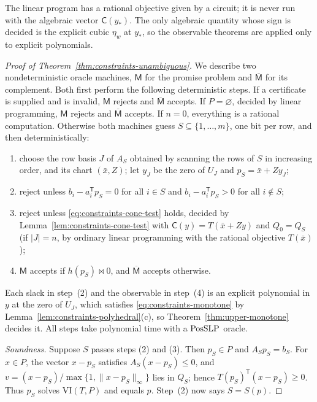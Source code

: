The linear program has a rational objective given by a circuit; it is never
run with the algebraic vector $\mathsf C(y_*)$. The only algebraic quantity
whose sign is decided is the explicit cubic $\eta_w$ at $y_*$, so the
observable theorems are applied only to explicit polynomials.

\begin{proof}[Proof of Theorem~\ref{thm:constraints-unambiguous}]
We describe two nondeterministic oracle machines, $\mathsf M$ for the
promise problem and $\overline{\mathsf M}$ for its complement. Both first
perform the following deterministic steps. If a certificate is supplied and is
invalid, $\mathsf M$ rejects and $\overline{\mathsf M}$ accepts. If
$P=\varnothing$, decided by linear programming, $\mathsf M$ rejects and
$\overline{\mathsf M}$ accepts. If $n=0$, everything is a rational
computation. Otherwise both machines guess $S\subseteq\{1,\ldots,m\}$, one bit
per row, and then deterministically:
\begin{enumerate}[label=(\arabic*)]
\item choose the row basis $J$ of $A_S$ obtained by scanning the rows of $S$
in increasing order, and its chart $(\bar x,Z)$; let $y_J$ be the zero of
$U_J$ and $p_S=\bar x+Zy_J$;
\item reject unless $b_i-a_i^{\mathsf T}p_S=0$ for all $i\in S$ and
$b_i-a_i^{\mathsf T}p_S>0$ for all $i\notin S$;
\item reject unless \eqref{eq:constraints-cone-test} holds, decided by
Lemma~\ref{lem:constraints-cone-test} with $\mathsf C(y)=T(\bar x+Zy)$ and
$Q_0=Q_S$ (if $|J|=n$, by ordinary linear programming with the rational
objective $T(\bar x)$);
\item $\mathsf M$ accepts if $h(p_S)\bowtie0$, and $\overline{\mathsf M}$
accepts otherwise.
\end{enumerate}
Each slack in step~(2) and the observable in step~(4) is an explicit
polynomial in $y$ at the zero of $U_J$, which satisfies
\eqref{eq:constraints-monotone} by Lemma~\ref{lem:constraints-polyhedral}(c),
so Theorem~\ref{thm:upper-monotone} decides it. All steps take polynomial time
with a $\mathrm{PosSLP}$ oracle.

\emph{Soundness.} Suppose $S$ passes steps (2) and (3). Then $p_S\in P$ and
$A_Sp_S=b_S$. For $x\in P$, the vector $x-p_S$ satisfies
$A_S(x-p_S)\le0$, and $v=(x-p_S)/\max\{1,\|x-p_S\|_\infty\}$ lies in $Q_S$;
hence $T(p_S)^{\mathsf T}(x-p_S)\ge0$. Thus $p_S$ solves $\mathrm{VI}(T,P)$
and equals $p$. Step~(2) now says $S=S(p)$.


\end{proof}
